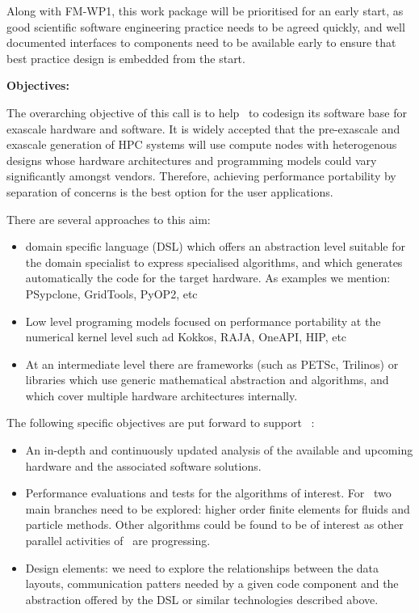 \documentclass{article}
\begin{document}
Along with FM-WP1, this work package will be prioritised for an early start, as 
good scientific software engineering practice needs to be agreed quickly, and well 
documented interfaces to components need to be available early to ensure that best 
practice design is embedded from the start.

\textbf{Objectives:}

The overarching objective of this call is to help \nep \  to codesign its software 
base for exascale hardware and software. It is widely accepted that the pre-exascale 
and exascale generation of HPC systems will use compute nodes with heterogenous 
designs whose hardware architectures and programming models could vary significantly 
amongst vendors. Therefore, achieving performance portability by separation of 
concerns is the best option for the user applications.

There are several approaches to this aim:  

\begin{itemize}
\item domain specific language (DSL) which offers an abstraction level suitable for 
the domain specialist to express specialised algorithms, and which generates automatically 
the code for the target hardware. As examples we mention: PSypclone, GridTools, 
PyOP2, etc 
\item Low level programing models focused on performance portability at the numerical 
kernel level such ad Kokkos, RAJA, OneAPI, HIP, etc 
\item At an intermediate level there are frameworks (such as PETSc, Trilinos) or libraries 
which use generic mathematical abstraction and algorithms, and which cover multiple 
hardware architectures internally.
\end{itemize}

The following specific objectives are put forward to support \nep \ : 

\begin{itemize}
\item An in-depth and continuously updated analysis of the available and upcoming 
hardware and the associated software solutions. 

\item Performance evaluations and tests for the algorithms of interest. For \nep \  
two main branches need to be explored: higher order finite elements for fluids 
and particle methods. Other algorithms could be found to be of interest as other 
parallel activities of \nep \  are progressing. 

\item Design elements: we need to explore the relationships between the data layouts, 
communication patters needed by a given code component and the abstraction offered 
by the DSL or similar technologies described above.
\end{itemize}
\end{document}

